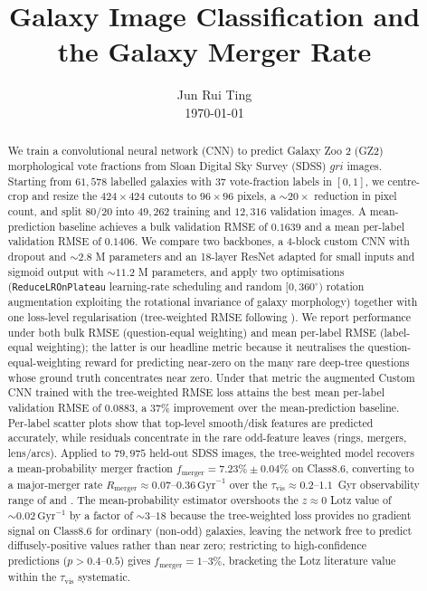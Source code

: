 \documentclass[10pt,preprint2]{aastex}
\begin{document}
\title{Galaxy Image Classification and the Galaxy Merger Rate}
\author{Jun Rui Ting \\ \today\vspace{-2.5\baselineskip}}

\begin{abstract}
We train a convolutional neural network (CNN) to predict Galaxy Zoo 2 (GZ2) morphological vote fractions from Sloan Digital Sky Survey (SDSS) $gri$ images. Starting from $61{,}578$ labelled galaxies with 37 vote-fraction labels in $[0,1]$, we centre-crop and resize the $424\times424$ cutouts to $96\times96$ pixels, a $\sim 20\times$ reduction in pixel count, and split 80/20 into $49{,}262$ training and $12{,}316$ validation images. A mean-prediction baseline achieves a bulk validation RMSE of $0.1639$ and a mean per-label validation RMSE of $0.1406$. We compare two backbones, a 4-block custom CNN with dropout and $\sim 2.8$ M parameters and an 18-layer ResNet adapted for small inputs and sigmoid output with $\sim 11.2$ M parameters, and apply two optimisations (\texttt{ReduceLROnPlateau} learning-rate scheduling and random $[0, 360^\circ)$ rotation augmentation exploiting the rotational invariance of galaxy morphology) together with one loss-level regularisation (tree-weighted RMSE following \citealt{Dieleman2015}). We report performance under both bulk RMSE (question-equal weighting) and mean per-label RMSE (label-equal weighting); the latter is our headline metric because it neutralises the question-equal-weighting reward for predicting near-zero on the many rare deep-tree questions whose ground truth concentrates near zero. Under that metric the augmented Custom CNN trained with the tree-weighted RMSE loss attains the best mean per-label validation RMSE of $0.0883$, a $37\%$ improvement over the mean-prediction baseline. Per-label scatter plots show that top-level smooth/disk features are predicted accurately, while residuals concentrate in the rare odd-feature leaves (rings, mergers, lens/arcs). Applied to $79{,}975$ held-out SDSS images, the tree-weighted model recovers a mean-probability merger fraction $f_{\mathrm{merger}} = 7.23\% \pm 0.04\%$ on Class$8.6$, converting to a major-merger rate $R_{\mathrm{merger}} \approx 0.07$--$0.36\,\mathrm{Gyr}^{-1}$ over the $\tau_{\mathrm{vis}} \approx 0.2$--$1.1$~Gyr observability range of \citet{Lotz2008,Lotz2011} and \citet{RodriguezGomez2015}. The mean-probability estimator overshoots the $z \approx 0$ Lotz value of $\sim 0.02\,\mathrm{Gyr}^{-1}$ by a factor of $\sim 3$--$18$ because the tree-weighted loss provides no gradient signal on Class$8.6$ for ordinary (non-odd) galaxies, leaving the network free to predict diffusely-positive values rather than near zero; restricting to high-confidence predictions ($p > 0.4$--$0.5$) gives $f_{\mathrm{merger}} = 1$--$3\%$, bracketing the Lotz literature value within the $\tau_{\mathrm{vis}}$ systematic.

\vspace{2.5\baselineskip}
\end{abstract}
\end{document}
